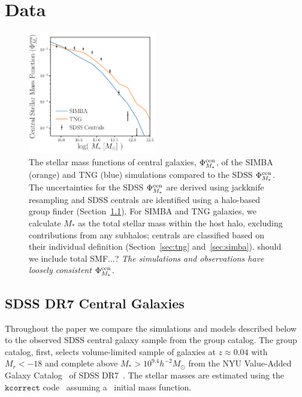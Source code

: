 \section{Data}\label{sec:sims}
\begin{figure}
\begin{center}
\includegraphics[width=0.5\textwidth]{figs/smfs.pdf} 
    \caption{The stellar mass functions of central galaxies, $\Phi^{\rm
    cen}_{M_*}$, of the SIMBA (orange) and TNG (blue) simulations compared to
    the SDSS $\Phi^{\rm cen}_{M_*}$. The uncertainties for the SDSS $\Phi^{\rm
    cen}_{M_*}$ are derived using jackknife resampling and SDSS centrals are
    identified using a halo-based group finder (Section~\ref{sec:obs}). For
    SIMBA and TNG galaxies, we calculate $M_*$ as the total stellar mass within
    the host halo, excluding contributions from any subhalos; centrals are
    classified based on their individual definition (Section~\ref{sec:tng}
    and~\ref{sec:simba}). {\color{red} should we include total SMF...?} 
    {\em The simulations and observations have loosely consistent $\Phi^{\rm
    cen}_{M_*}$.} 
    }
\label{fig:smf}
\end{center}
\end{figure}

\subsection{SDSS DR7 Central Galaxies} \label{sec:obs} 
Throughout the paper we compare the simulations and models described below
to the observed SDSS central galaxy sample from the \cite{tinker2011} group
catalog. The group catalog, first, selects volume-limited sample of galaxies at
$z \approx 0.04$ with $M_r < -18$ and complete above $M_* > 10^{9.4}
h^{-2}M_\odot$ from the NYU Value-Added Galaxy
Catalog~\citep[VAGC;][]{blanton2005} of SDSS DR7~\citep{abazajian2009}. The
stellar masses are estimated using the $\mathtt{kcorrect}$
code~\citep{blanton2007a} assuming a~\cite{chabrier2003} initial mass
function. 

